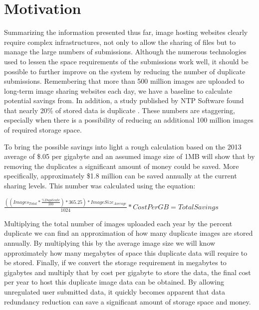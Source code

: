 \section{Motivation} \label{sec:motivation}
Summarizing the information presented thus far, image hosting websites clearly require complex infrastructures, not only to allow the sharing of files but to manage the large numbers of submissions. Although the numerous technologies used to lessen the space requirements of the submissions work well, it should be possible to further improve on the system by reducing the number of duplicate submissions. Remembering that more than 500 million images are uploaded to long-term image sharing websites each day, we have a baseline to calculate potential savings from. In addition, a study published by NTP Software found that nearly 20\% of stored data is duplicate \cite{ntps:staledata}. These numbers are staggering, especially when there is a possibility of reducing an additional 100 million images of required storage space.

To bring the possible savings into light a rough calculation based on the 2013 average of \$.05 per gigabyte and an assumed image size of 1MB will show that by removing the duplicates a significant amount of money could be saved. More specifically, approximately \$1.8 million can be saved annually at the current sharing levels. This number was calculated using the equation:
\begin{center}
$\frac{((Images_{Total}*\frac{\%Duplicate}{100})*365.25)*ImageSize_{Average}}{1024}*CostPerGB=TotalSavings$
\end{center}
Multiplying the total number of images uploaded each year by the percent duplicate we can find an approximation of how many duplicate images are stored annually. By multiplying this by the average image size we will know approximately how many megabytes of space this duplicate data will require to be stored. Finally, if we convert the storage requirement in megabytes to gigabytes and multiply that by cost per gigabyte to store the data, the final cost per year to host this duplicate image data can be obtained. By allowing unregulated user submitted data, it quickly becomes apparent that data redundancy reduction can save a significant amount of storage space and money.

